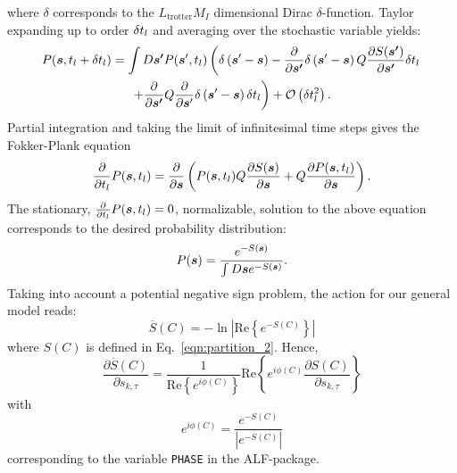 where $\delta$ corresponds to the $L_\mathrm{trotter} M_I $ dimensional Dirac $\delta$-function.   Taylor expanding  up to order $\delta t_{l}$  and averaging over the stochastic variable yields:
\begin{multline}
P(\boldsymbol{s}, t_{l}  + \delta t_{l} ) = \int D\boldsymbol{s'}  P  (\boldsymbol{s}', t_{l}  )   \left(   \delta \left(  \boldsymbol{s}' - \boldsymbol{s}   \right)
-   \frac{\partial  }{\partial    \boldsymbol{s'} } \delta \left(  \boldsymbol{s}' - \boldsymbol{s} \right) Q \frac{\partial S(\boldsymbol{s'}) }{\partial    \boldsymbol{s'} }  \delta t_{l}   \right.  \\
   \left. + \frac{\partial  }{\partial    \boldsymbol{s'} } Q  \frac{\partial  }{\partial    \boldsymbol{s}' }  \delta \left(  \boldsymbol{s}' - \boldsymbol{s}\right)    \delta t_{l}
\right)  + {\cal O}  \left(  \delta t_{l}^2 \right).
\end{multline}
Partial integration  and taking the limit of infinitesimal time steps   gives the Fokker-Plank equation
\begin{equation}
         \frac{\partial  }{\partial   t_{l}}  P( \boldsymbol{s}, t_{l})  =  \frac{\partial  }{\partial    \boldsymbol{s} }  \left( P( \boldsymbol{s}, t_{l})  Q\frac{\partial S(\boldsymbol{s}) }{\partial     \boldsymbol{s} }   +
        Q  \frac{\partial P(\boldsymbol{s},t_{l}) }{\partial     \boldsymbol{s} }
         \right) .
\end{equation}
The stationary,  $ \frac{\partial  }{\partial   t_{l}}  P( \boldsymbol{s}, t_{l}) =0$,  normalizable,  solution to the above equation corresponds to the desired probability distribution:
\begin{equation}\label{eqn:langevin_solution}
          P(\boldsymbol{s}) =  \frac{ e^{ - S(\boldsymbol{s}) } }   {   \int D \boldsymbol{s}  e^{ - S(\boldsymbol{s}) } }.
\end{equation}
Taking into account a potential negative sign problem, the action   for our general model reads:
\begin{equation}
	\overline{S}(C)   = -  \ln \left|  \text{Re} \left\{  e^{-S(C)} \right\} \right| 
\end{equation}
where  $S(C) $  is defined in Eq.~\eqref{eqn:partition_2}. Hence, 
\begin{equation}
   \frac{ \partial{\overline{S}(C)}} {\partial s_{k,\tau} }    =   \frac{1}{\text{Re} \left\{e^{i \phi(C)}\right\} } \text{Re} \left\{  e^{i\phi(C)}\frac{ \partial S (C)} {\partial s_{k,\tau} }   \right\}
\end{equation}
with
\begin{equation}
	e^{i \phi(C)}  =   \frac{e^{- S(C)}}{| e^{-S(C)}  |}
\end{equation}
corresponding to the variable \texttt{PHASE}  in the ALF-package. 

